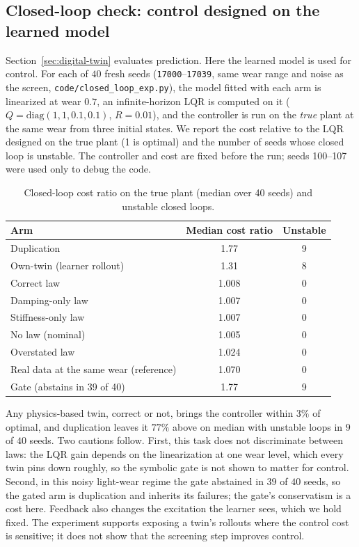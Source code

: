 \subsection{Closed-loop check: control designed on the learned model}\label{app:closedloop}
Section~\ref{sec:digital-twin} evaluates prediction. Here the learned model is used for control. For each of $40$ fresh seeds (\texttt{17000}--\texttt{17039}, same wear range and noise as the screen, \texttt{code/closed\_loop\_exp.py}), the model fitted with each arm is linearized at wear $0.7$, an infinite-horizon LQR is computed on it ($Q=\mathrm{diag}(1,1,0.1,0.1)$, $R=0.01$), and the controller is run on the \emph{true} plant at the same wear from three initial states. We report the cost relative to the LQR designed on the true plant (1 is optimal) and the number of seeds whose closed loop is unstable. The controller and cost are fixed before the run; seeds 100--107 were used only to debug the code.
\begin{table}[H]\centering\small
\caption{Closed-loop cost ratio on the true plant (median over 40 seeds) and unstable closed loops.}\label{tab:closedloop}
\begin{tabular}{lcc}
\toprule
Arm & Median cost ratio & Unstable\\
\midrule
Duplication & 1.77 & 9\\
Own-twin (learner rollout) & 1.31 & 8\\
Correct law & 1.008 & 0\\
Damping-only law & 1.007 & 0\\
Stiffness-only law & 1.007 & 0\\
No law (nominal) & 1.005 & 0\\
Overstated law & 1.024 & 0\\
Real data at the same wear (reference) & 1.070 & 0\\
Gate (abstains in 39 of 40) & 1.77 & 9\\
\bottomrule
\end{tabular}
\end{table}
Any physics-based twin, correct or not, brings the controller within $3\%$ of optimal, and duplication leaves it $77\%$ above on median with unstable loops in $9$ of $40$ seeds. Two cautions follow. First, this task does not discriminate between laws: the LQR gain depends on the linearization at one wear level, which every twin pins down roughly, so the symbolic gate is not shown to matter for control. Second, in this noisy light-wear regime the gate abstained in $39$ of $40$ seeds, so the gated arm is duplication and inherits its failures; the gate's conservatism is a cost here. Feedback also changes the excitation the learner sees, which we hold fixed. The experiment supports exposing a twin's rollouts where the control cost is sensitive; it does not show that the screening step improves control.

